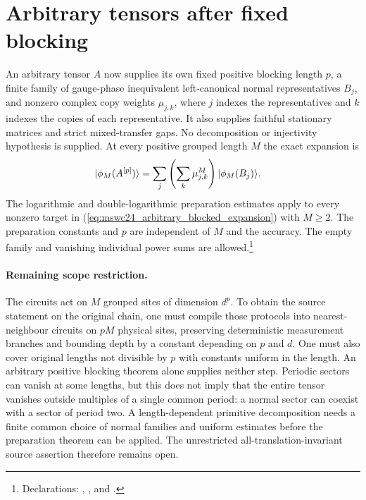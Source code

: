 \documentclass{article}
\begin{document}
\section{Arbitrary tensors after fixed blocking}
An arbitrary tensor $A$ now supplies its own fixed positive blocking length $p$,
a finite family of gauge-phase inequivalent left-canonical normal representatives
$B_j$, and nonzero complex copy weights $\mu_{j,k}$, where $j$ indexes the
representatives and $k$ indexes the copies of each representative. It also supplies
faithful stationary matrices and strict mixed-transfer gaps. No decomposition or injectivity hypothesis is
supplied. At every positive grouped length $M$ the exact expansion is
\begin{align}
    |\phi_M(A^{[p]})\rangle
     & =\sum_j\left(\sum_k\mu_{j,k}^{M}\right)|\phi_M(B_j)\rangle.
    \label{eq:mswc24_arbitrary_blocked_expansion}
\end{align}
The logarithmic and double-logarithmic preparation estimates apply to every
nonzero target in (\ref{eq:mswc24_arbitrary_blocked_expansion}) with $M\geq2$.
The preparation constants and $p$ are independent of $M$ and the accuracy.
The empty family and vanishing individual power sums are allowed.\footnote{
    Declarations:
    ,
    ,
    and
    .}

\paragraph{Remaining scope restriction.}
The circuits act on $M$ grouped sites of dimension $d^p$. To obtain the source
statement on the original chain, one must compile those protocols into
nearest-neighbour circuits on $pM$ physical sites, preserving deterministic
measurement branches and bounding depth by a constant depending on $p$ and $d$.
One must also cover original lengths not divisible by $p$ with constants uniform
in the length. An arbitrary positive blocking theorem alone supplies neither
step. Periodic sectors can vanish at some lengths, but this does not imply that
the entire tensor vanishes outside multiples of a single common period: a
normal sector can coexist with a sector of period two. A length-dependent
primitive decomposition needs a finite common choice of normal families and
uniform estimates before the preparation theorem can be applied. The
unrestricted all-translation-invariant source assertion therefore remains open.



\end{document}
